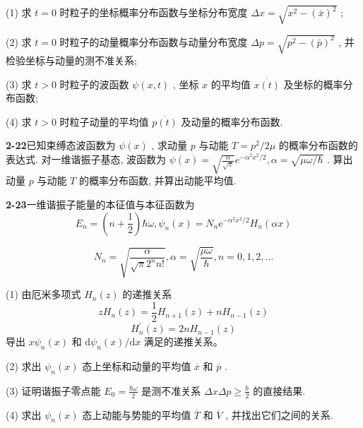 (1) 求 $t = 0$ 时粒子的坐标概率分布函数与坐标分布宽度 $\Delta x = \sqrt{x^2 - (\bar{x})^2}$ ; 

(2) 求 $t = 0$ 时粒子的动量概率分布函数与动量分布宽度 $\Delta p = \sqrt{p^2 - (\bar{p})^2}$ , 并检验坐标与动量的测不准关系; 

(3) 求 $t > 0$ 时粒子的波函数 $\psi(x, t)$ , 坐标 $x$ 的平均值 $\overline{x(t)}$ 及坐标的概率分布函数; 

(4) 求 $t > 0$ 时粒子动量的平均值 $\overline{p(t)}$ 及动量的概率分布函数.

\vfill

\newpage
\vfill

\noindent
\textbf{2-22}\quad 已知束缚态波函数为 $\psi(x)$ , 求动量 $p$ 与动能 $T = p^2 / 2\mu$ 的概率分布函数的表达式. 对一维谐振子基态, 波函数为 $\psi(x) = \sqrt{\frac{\alpha}{\sqrt{\pi}}} e^{-\alpha^2 x^2 / 2}, \alpha = \sqrt{\mu \omega / \hbar}$ . 算出动量 $p$ 与动能 $T$ 的概率分布函数, 并算出动能平均值.

\vfill

\newpage
\vfill

\noindent
\textbf{2-23}\quad 一维谐振子能量的本征值与本征函数为
\begin{equation}\tag{1}
E _ {n} = \left(n + \frac {1}{2}\right) \hbar \omega , \psi_ {n} (x) = N _ {n} \mathrm{e} ^ {- \alpha^ {2} x ^ {2} / 2} H _ {n} (\alpha x)
\end{equation}

\begin{equation}\tag{2}
N _ {n} = \sqrt {\frac {\alpha}{\sqrt {\pi} 2 ^ {n} n !}}, \alpha = \sqrt {\frac {\mu \omega}{\hbar}}, n = 0, 1, 2, \dots
\end{equation}

(1) 由厄米多项式 $H_{n}(z)$ 的递推关系
\begin{equation}\tag{3}
z H _ {n} (z) = \frac {1}{2} H _ {n + 1} (z) + n H _ {n - 1} (z)
\end{equation}
\begin{equation}\tag{4}
H _ {n} ^ {\prime} (z) = 2 n H _ {n - 1} (z)
\end{equation}
导出 $x \psi_{n}(x)$ 和 $\mathrm{d} \psi_{n}(x) / \mathrm{d} x$ 满足的递推关系。

(2) 求出 $\psi_{n}(x)$ 态上坐标和动量的平均值 $\overline{x}$ 和 $\overline{p}$ . 

(3) 证明谐振子零点能 $E_{0} = \frac{\hbar \omega}{2}$ 是测不准关系 $\Delta x \Delta p \geqslant \frac{\hbar}{2}$ 的直接结果. 

(4) 求出 $\psi_{n}(x)$ 态上动能与势能的平均值 $\overline{T}$ 和 $\overline{V}$ , 并找出它们之间的关系.

